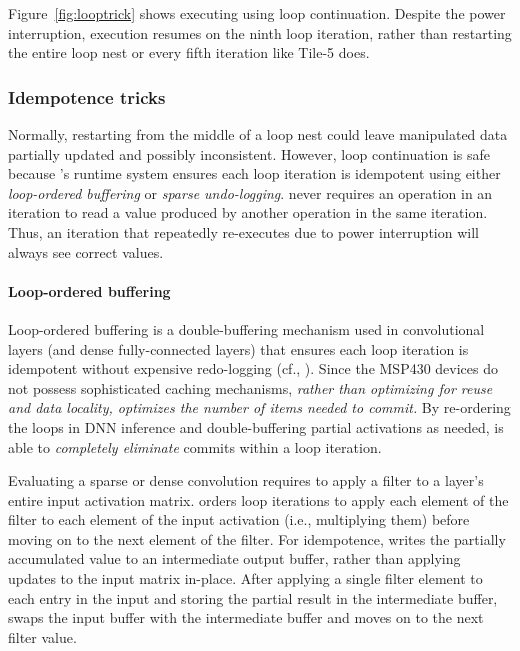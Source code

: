Figure~\ref{fig:looptrick} shows \sonic executing using loop
continuation.  Despite the power interruption, execution resumes on the ninth
loop iteration, rather than restarting the entire loop nest or every fifth iteration
like Tile-5 does.

\subsubsection{Idempotence tricks}
\label{sonic:sonic:idempotence}

Normally, restarting from the middle of a loop nest could leave manipulated
data partially updated and possibly inconsistent.  However, loop continuation
is safe because \sonic's runtime system ensures each loop iteration is idempotent
using either {\em loop-ordered buffering} or {\em sparse undo-logging}.
%
\sonic never requires an operation in an iteration to read a value
produced by another operation in the same iteration.
Thus, an iteration that repeatedly re-executes due to power interruption will always
see correct values.

\paragraph{Loop-ordered buffering}
Loop-ordered buffering is a double-buffering mechanism used in convolutional
layers (and dense fully-connected layers)
that ensures each loop iteration is idempotent without expensive redo-logging (cf., \cite{alpaca}). 
%
Since the MSP430 devices do not possess sophisticated caching
mechanisms, \emph{rather than optimizing for reuse and data locality, \sonic
  optimizes the number of items needed to commit.}
%
By re-ordering the loops in DNN inference and double-buffering partial activations as needed,
\sonic is able to \emph{completely eliminate} commits within a loop iteration.

Evaluating a sparse or dense convolution requires \sonic to apply a filter to a
layer's entire input activation matrix.  
%
\sonic orders loop iterations to apply each element of the filter to each
element of the input activation (i.e., multiplying them) before moving on
to the next element of the filter.
%
For idempotence,
\sonic writes the partially accumulated value to an intermediate output buffer,
rather than applying updates to the input matrix in-place.
%
After applying a single filter element to each entry in the input and storing
the partial result in the intermediate buffer, \sonic swaps the input
buffer with the intermediate buffer and moves on to the next filter value.

